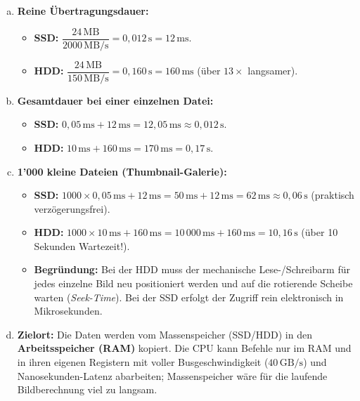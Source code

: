 \begin{myexercise}
    \begin{myanswer}
        \begin{enumerate}[(a)]
            \item \textbf{Reine Übertragungsdauer:}
            \begin{itemize}
                \item \textbf{\gls{SSD}:} $\dfrac{24\,\mathrm{MB}}{2000\,\mathrm{MB/s}} = 0{,}012\,\mathrm{s} = 12\,\mathrm{ms}$.
                \item \textbf{\gls{HDD}:} $\dfrac{24\,\mathrm{MB}}{150\,\mathrm{MB/s}} = 0{,}160\,\mathrm{s} = 160\,\mathrm{ms}$ (über $13\times$ langsamer).
            \end{itemize}
            \item \textbf{Gesamtdauer bei einer einzelnen Datei:}
            \begin{itemize}
                \item \textbf{\gls{SSD}:} $0{,}05\,\mathrm{ms} + 12\,\mathrm{ms} = 12{,}05\,\mathrm{ms} \approx 0{,}012\,\mathrm{s}$.
                \item \textbf{\gls{HDD}:} $10\,\mathrm{ms} + 160\,\mathrm{ms} = 170\,\mathrm{ms} = 0{,}17\,\mathrm{s}$.
            \end{itemize}
            \item \textbf{1'000 kleine Dateien (Thumbnail-Galerie):}
            \begin{itemize}
                \item \textbf{\gls{SSD}:} $1000 \times 0{,}05\,\mathrm{ms} + 12\,\mathrm{ms} = 50\,\mathrm{ms} + 12\,\mathrm{ms} = 62\,\mathrm{ms} \approx 0{,}06\,\mathrm{s}$ (praktisch verzögerungsfrei).
                \item \textbf{\gls{HDD}:} $1000 \times 10\,\mathrm{ms} + 160\,\mathrm{ms} = 10\,000\,\mathrm{ms} + 160\,\mathrm{ms} = 10{,}16\,\mathrm{s}$ (über 10 Sekunden Wartezeit!).
                \item \textbf{Begründung:} Bei der \gls{HDD} muss der mechanische Lese-/Schreibarm für jedes einzelne Bild neu positioniert werden und auf die rotierende Scheibe warten (\emph{Seek-Time}). Bei der \gls{SSD} erfolgt der Zugriff rein elektronisch in Mikrosekunden.
            \end{itemize}
            \item \textbf{Zielort:} Die Daten werden vom Massenspeicher (\gls{SSD}/\gls{HDD}) in den \textbf{Arbeitsspeicher (\gls{RAM})} kopiert. Die \gls{CPU} kann Befehle nur im \gls{RAM} und in ihren eigenen Registern mit voller Busgeschwindigkeit ($40\,\mathrm{GB/s}$) und Nanosekunden-Latenz abarbeiten; Massenspeicher wäre für die laufende Bildberechnung viel zu langsam.

\end{enumerate}
\end{myanswer}
\end{myexercise}
